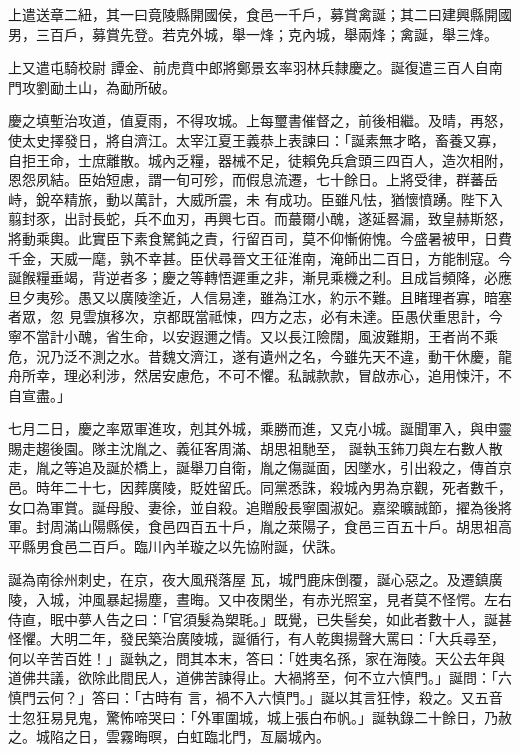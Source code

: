\begin{pinyinscope}
 上遣送章二紐，其一曰竟陵縣開國侯，食邑一千戶，募賞禽誕；其二曰建興縣開國男，三百戶，募賞先登。若克外城，舉一烽；克內城，舉兩烽；禽誕，舉三烽。



 上又遣屯騎校尉
 譚金、前虎賁中郎將鄭景玄率羽林兵隸慶之。誕復遣三百人自南門攻劉勔土山，為勔所破。



 慶之填塹治攻道，值夏雨，不得攻城。上每璽書催督之，前後相繼。及晴，再怒，使太史擇發日，將自濟江。太宰江夏王義恭上表諫曰：「誕素無才略，畜養又寡，自拒王命，士庶離散。城內乏糧，器械不足，徒賴免兵倉頭三四百人，造次相附，恩怨夙結。臣始短慮，謂一旬可殄，而假息流遷，七十餘日。上將受律，群蕃岳峙，銳卒精旅，動以萬計，大威所震，未
 有成功。臣雖凡怯，猶懷憤踴。陛下入翦封豕，出討長蛇，兵不血刃，再興七百。而蕞爾小醜，遂延晷漏，致皇赫斯怒，將動乘輿。此實臣下素食駑鈍之責，行留百司，莫不仰慚俯愧。今盛暑被甲，日費千金，天威一麾，孰不幸甚。臣伏尋晉文王征淮南，淹師出二百日，方能制寇。今誕餱糧垂竭，背逆者多；慶之等轉悟遲重之非，漸見乘機之利。且成旨頻降，必應旦夕夷殄。愚又以廣陵塗近，人信易達，雖為江水，約示不難。且睹理者寡，暗塞者眾，忽
 見雲旗移次，京都既當祗悚，四方之志，必有未達。臣愚伏重思計，今寧不當計小醜，省生命，以安遐邇之情。又以長江險闊，風波難期，王者尚不乘危，況乃泛不測之水。昔魏文濟江，遂有遺州之名，今雖先天不違，動干休慶，龍舟所幸，理必利涉，然居安慮危，不可不懼。私誠款款，冒啟赤心，追用悚汗，不自宣盡。」



 七月二日，慶之率眾軍進攻，剋其外城，乘勝而進，又克小城。誕聞軍入，與申靈賜走趨後園。隊主沈胤之、義征客周滿、胡思祖馳至，
 誕執玉鈽刀與左右數人散走，胤之等追及誕於橋上，誕舉刀自衛，胤之傷誕面，因墜水，引出殺之，傳首京邑。時年二十七，因葬廣陵，貶姓留氏。同黨悉誅，殺城內男為京觀，死者數千，女口為軍賞。誕母殷、妻徐，並自殺。追贈殷長寧園淑妃。嘉梁曠誠節，擢為後將軍。封周滿山陽縣侯，食邑四百五十戶，胤之萊陽子，食邑三百五十戶。胡思祖高平縣男食邑二百戶。臨川內羊璇之以先協附誕，伏誅。



 誕為南徐州刺史，在京，夜大風飛落屋
 瓦，城門鹿床倒覆，誕心惡之。及遷鎮廣陵，入城，沖風暴起揚塵，晝晦。又中夜閑坐，有赤光照室，見者莫不怪愕。左右侍直，眠中夢人告之曰：「官須髮為槊毦。」既覺，已失髻矣，如此者數十人，誕甚怪懼。大明二年，發民築治廣陵城，誕循行，有人乾輿揚聲大罵曰：「大兵尋至，何以辛苦百姓！」誕執之，問其本末，答曰：「姓夷名孫，家在海陵。天公去年與道佛共議，欲除此間民人，道佛苦諫得止。大禍將至，何不立六慎門。」誕問：「六慎門云何？」答曰：「古時有
 言，禍不入六慎門。」誕以其言狂悖，殺之。又五音士忽狂易見鬼，驚怖啼哭曰：「外軍圍城，城上張白布帆。」誕執錄二十餘日，乃赦之。城陷之日，雲霧晦暝，白虹臨北門，亙屬城內。




\end{pinyinscope}
